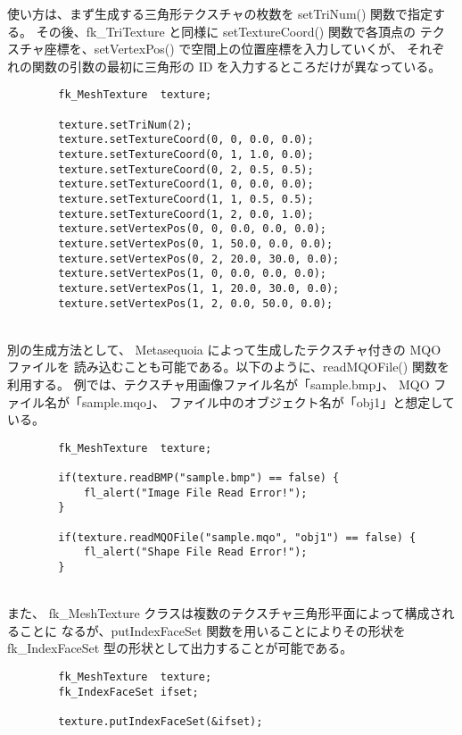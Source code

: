 使い方は、まず生成する三角形テクスチャの枚数を setTriNum() 関数で指定する。
その後、fk\_TriTexture と同様に setTextureCoord() 関数で各頂点の
テクスチャ座標を、setVertexPos() で空間上の位置座標を入力していくが、
それぞれの関数の引数の最初に三角形の ID を入力するところだけが異なっている。
\\
\begin{breakbox}
\begin{verbatim}
        fk_MeshTexture  texture;

        texture.setTriNum(2);
        texture.setTextureCoord(0, 0, 0.0, 0.0);
        texture.setTextureCoord(0, 1, 1.0, 0.0);
        texture.setTextureCoord(0, 2, 0.5, 0.5);
        texture.setTextureCoord(1, 0, 0.0, 0.0);
        texture.setTextureCoord(1, 1, 0.5, 0.5);
        texture.setTextureCoord(1, 2, 0.0, 1.0);
        texture.setVertexPos(0, 0, 0.0, 0.0, 0.0);
        texture.setVertexPos(0, 1, 50.0, 0.0, 0.0);
        texture.setVertexPos(0, 2, 20.0, 30.0, 0.0);
        texture.setVertexPos(1, 0, 0.0, 0.0, 0.0);
        texture.setVertexPos(1, 1, 20.0, 30.0, 0.0);
        texture.setVertexPos(1, 2, 0.0, 50.0, 0.0);
\end{verbatim}
\end{breakbox}
~ \\
別の生成方法として、
Metasequoia によって生成したテクスチャ付きの MQO ファイルを
読み込むことも可能である。以下のように、readMQOFile() 関数を利用する。
例では、テクスチャ用画像ファイル名が「sample.bmp」、
MQO ファイル名が「sample.mqo」、
ファイル中のオブジェクト名が「obj1」と想定している。
\\
\begin{breakbox}
\begin{verbatim}
        fk_MeshTexture  texture;

        if(texture.readBMP("sample.bmp") == false) {
            fl_alert("Image File Read Error!");
        }

        if(texture.readMQOFile("sample.mqo", "obj1") == false) {
            fl_alert("Shape File Read Error!");
        }
\end{verbatim}
\end{breakbox}
~ \\
また、
fk\_MeshTexture クラスは複数のテクスチャ三角形平面によって構成されることに
なるが、putIndexFaceSet 関数を用いることによりその形状を
fk\_IndexFaceSet 型の形状として出力することが可能である。
\\
\begin{breakbox}
\begin{verbatim}
        fk_MeshTexture  texture;
        fk_IndexFaceSet ifset;

        texture.putIndexFaceSet(&ifset);
\end{verbatim}
\end{breakbox}

